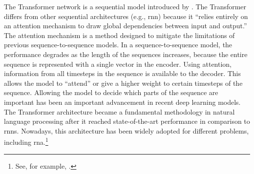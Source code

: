 

The Transformer network is a sequential model introduced by
\textcite[p.~2]{vaswani2017attention}. The Transformer
differs from other sequential architectures (e.g.,
\gls{rnn}) because it ``relies entirely on an attention
mechanism to draw global dependencies between input and
output.'' The attention mechanism is a method designed to
mitigate the limitations of previous sequence-to-sequence
models. In a sequence-to-sequence model, the performance
degrades as the length of the sequences increases, because
the entire sequence is represented with a single vector in
the encoder. Using attention, information from all timesteps
in the sequence is available to the decoder. This allows the
model to ``attend'' or give a higher weight to certain
timesteps of the sequence. Allowing the model to decide
which parts of the sequence are important has been an
important advancement in recent deep learning models. The
Transformer architecture became a fundamental methodology in
natural language processing after it reached
state-of-the-art performance in comparison to \glspl{rnn}.
Nowadays, this architecture has been widely adopted for
different problems, including \gls{rna}.\footnote{See, for
example, \textcite{chen2021attend}.}
